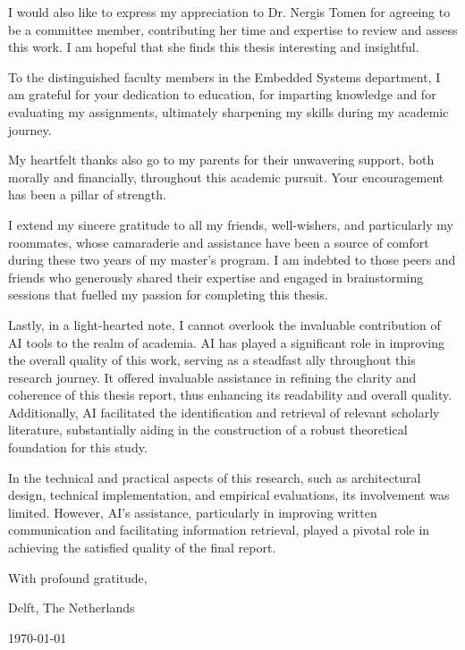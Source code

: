 \noindent I would also like to express my appreciation to Dr. Nergis Tomen for agreeing to be a committee member, contributing her time and expertise to review and assess this work. I am hopeful that she finds this thesis interesting and insightful.
\vspace{1\baselineskip}

\noindent To the distinguished faculty members in the Embedded Systems department, I am grateful for your dedication to education, for imparting knowledge and for evaluating my assignments, ultimately sharpening my skills during my academic journey.
\vspace{1\baselineskip}

\noindent My heartfelt thanks also go to my parents for their unwavering support, both morally and financially, throughout this academic pursuit. Your encouragement has been a pillar of strength.
\vspace{1\baselineskip}

\noindent I extend my sincere gratitude to all my friends, well-wishers, and particularly my roommates, whose camaraderie and assistance have been a source of comfort during these two years of my master's program. I am indebted to those peers and friends who generously shared their expertise and engaged in brainstorming sessions that fuelled my passion for completing this thesis.
\vspace{1\baselineskip}

\noindent Lastly, in a light-hearted note, I cannot overlook the invaluable contribution of AI tools to the realm of academia. AI has played a significant role in improving the overall quality of this work, serving as a steadfast ally throughout this research journey. It offered invaluable assistance in refining the clarity and coherence of this thesis report, thus enhancing its readability and overall quality. Additionally, AI facilitated the identification and retrieval of relevant scholarly literature, substantially aiding in the construction of a robust theoretical foundation for this study.
\vspace{1\baselineskip}

\noindent In the technical and practical aspects of this research, such as architectural design, technical implementation, and empirical evaluations, its involvement was limited. However, AI's assistance, particularly in improving written communication and facilitating information retrieval, played a pivotal role in achieving the satisfied quality of the final report.
\vspace{1\baselineskip}

\noindent With profound gratitude,

\noindent\reportAuthor

\vspace{1\baselineskip}

\noindent
Delft, The Netherlands

\noindent
\today